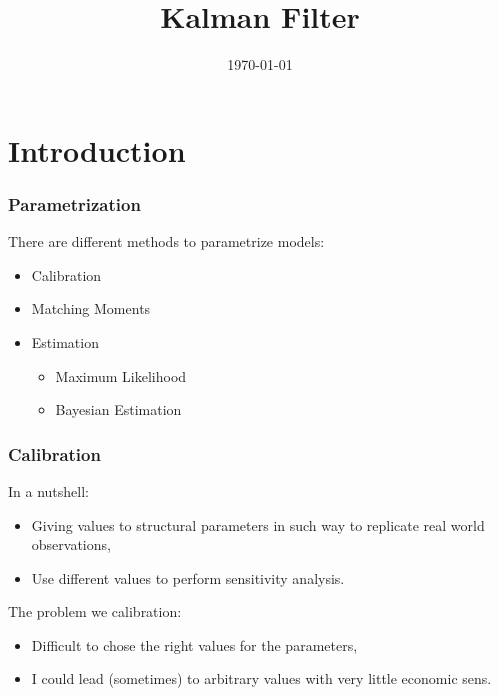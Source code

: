 \documentclass[notes=show]{beamer}%
\makeatletter
\let\beamer@writeslidentry@miniframeson=\beamer@writeslidentry
\newcommand*{\miniframeson}
{\let\beamer@writeslidentry=\beamer@writeslidentry@miniframeson}
\makeatother
\begin{document}
\title{Kalman Filter}


\date{\today}
\maketitle

\section{Introduction}

\miniframeson

\begin{frame}
\frametitle{Parametrization}


\noindent There are different methods to parametrize models:\\
\bigskip
\begin{center}
\begin{itemize}

\item Calibration
\item Matching Moments
\item Estimation
 \begin{itemize}
\item Maximum Likelihood
\item Bayesian Estimation
\end{itemize}
\end{itemize}

\end{center}

\end{frame}

\begin{frame}
\frametitle{Calibration}
In a nutshell:
\begin{center}
 \begin{itemize}
\item Giving values to structural parameters in such way to replicate real world observations,
\item Use different values to perform sensitivity analysis.
\end{itemize}
\end{center}
\bigskip
The problem we calibration:
\begin{itemize}
\item Difficult to chose the right values for the parameters,
\item I could lead (sometimes) to arbitrary values with very little economic sens. 
\end{itemize}
\end{frame}
\end{document}
